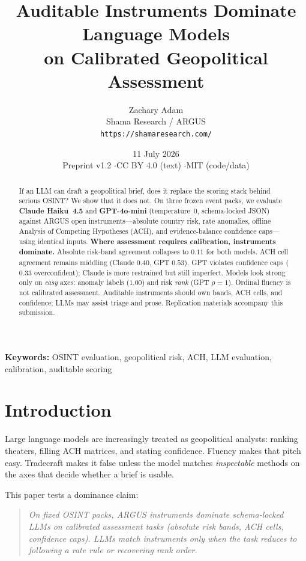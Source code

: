 \documentclass[11pt,a4paper]{article}
\title{\textbf{Auditable Instruments Dominate Language Models\\
on Calibrated Geopolitical Assessment}}
\author{
Zachary Adam\\
Shama Research / ARGUS\\
\texttt{https://shamaresearch.com/}
}
\date{11 July 2026\\[0.4em]
\small Preprint v1.2 \quad$\cdot$\quad CC BY 4.0 (text) \quad$\cdot$\quad MIT (code/data)}
\begin{document}
\maketitle

\begin{abstract}
\noindent
If an LLM can draft a geopolitical brief, does it replace the scoring stack behind serious OSINT?
We show that it does not.
On three frozen event packs, we evaluate \textbf{Claude Haiku~4.5} and \textbf{GPT-4o-mini}
(temperature~0, schema-locked JSON) against ARGUS open instruments---absolute country risk,
rate anomalies, offline Analysis of Competing Hypotheses (ACH), and evidence-balance confidence caps---using identical inputs.
\textbf{Where assessment requires calibration, instruments dominate.}
Absolute risk-band agreement collapses to $0.11$ for both models.
ACH cell agreement remains middling (Claude $0.40$, GPT $0.53$).
GPT violates confidence caps ($0.33$ overconfident); Claude is more restrained but still imperfect.
Models look strong only on \emph{easy} axes: anomaly labels ($1.00$) and risk \emph{rank} (GPT $\rho=1$).
Ordinal fluency is not calibrated assessment.
Auditable instruments should own bands, ACH cells, and confidence; LLMs may assist triage and prose.
Replication materials accompany this submission.
\end{abstract}

\noindent\textbf{Keywords:}
OSINT evaluation, geopolitical risk, ACH, LLM evaluation, calibration, auditable scoring

\section{Introduction}

Large language models are increasingly treated as geopolitical analysts: ranking theaters,
filling ACH matrices, and stating confidence.
Fluency makes that pitch easy.
Tradecraft makes it false unless the model matches \emph{inspectable} methods on the axes that
decide whether a brief is usable.

This paper tests a dominance claim:

\begin{quote}
\textit{On fixed OSINT packs, ARGUS instruments dominate schema-locked LLMs on calibrated
assessment tasks (absolute risk bands, ACH cells, confidence caps).
LLMs match instruments only when the task reduces to following a rate rule or recovering rank order.}
\end{quote}
\end{document}
